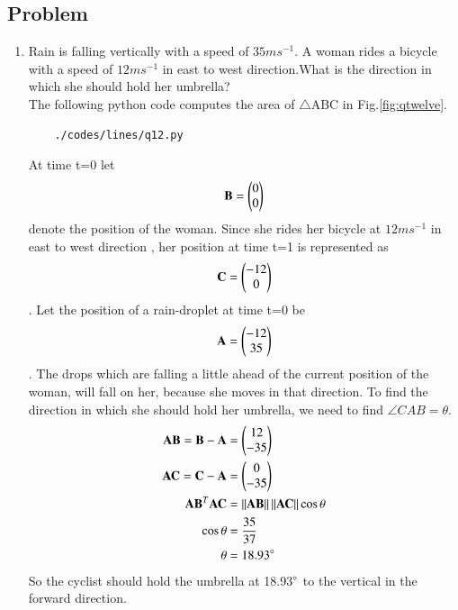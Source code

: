 \subsection{Problem}

\renewcommand{\theequation}{\theenumi}
\begin{enumerate}[label=\thesection.\arabic*.,ref=\thesection.\theenumi]
	\item Rain is falling vertically with a speed of $35ms^{-1}$. A woman rides a bicycle with a speed of $12ms^{-1}$ in east to west direction.What is the direction in which she should hold her umbrella?\\
The following python code computes the area of $\triangle$ABC in Fig.\ref{fig:qtwelve}.
	\begin{lstlisting}
	./codes/lines/q12.py
	\end{lstlisting}
	
	\solution At time t=0 let
\begin{align}
\mathbf{B} = \begin{pmatrix}0\\0\end{pmatrix}
\end{align}
 denote the position of the woman. Since she rides her bicycle at $12ms^{-1}$ in east to west direction , her position at time t=1 is represented as 
\begin{align}
\mathbf{C} = \begin{pmatrix}-12\\0\end{pmatrix}
\end{align}
. Let the position of a rain-droplet at time t=0 be 
\begin{align}
\mathbf{A} = \begin{pmatrix}-12\\35\end{pmatrix}
\end{align}
. The drops which are falling a little ahead of the current position of the woman, will fall on her, because she moves in that direction.
To find the direction in which she should hold her umbrella, we need to find $\angle{CAB} =\theta$. 
\begin{align}  
	\mathbf{AB = B-A} &= \begin{pmatrix}12\\-35\end{pmatrix}
	\\
	\mathbf{AC = C-A} &= \begin{pmatrix}0\\-35\end{pmatrix}
	\\
	\mathbf{AB}^T\mathbf{AC} &= \left\lVert\mathbf{AB}\right\rVert\left\lVert\mathbf{AC}\right\rVert\cos{\theta}
	\\
	\cos{\theta} &= \frac{35}{37}
	\\
	\theta &= 18.93\degree 
\end{align}
So the cyclist should hold the umbrella at 18.93$\degree$ to the vertical in the forward direction.


\end{enumerate}
